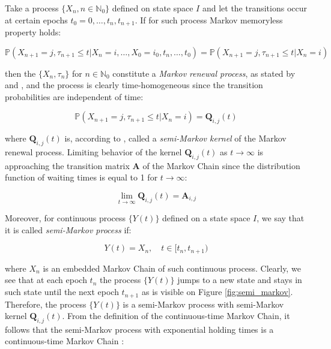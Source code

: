 Take a process $\{X_n,n \in \mathbb{N}_0\}$ defined on state space $I$ and let the transitions occur at certain epochs $t_0=0,\dots,t_n,t_{n+1}$. If for such process Markov memoryless property holds:

\begin{equation}
    \mathbb{P}(X_{n+1}=j, \tau_{n+1} \leq t|X_n=i,\ldots,X_0=i_0,t_n,\ldots,t_0) = \mathbb{P}(X_{n+1}=j, \tau_{n+1} \leq t|X_n=i)
\end{equation}

then the $\{X_n,\tau_n\}$ for $n \in \mathbb{N}_0$ constitute a \textit{Markov renewal process}, as stated by \citep{Cinlar1969} and \citep{Barbu2008}, and the process is clearly time-homogeneous since the transition probabilities are independent of time:

\begin{equation}
    \mathbb{P}(X_{n+1}=j, \tau_{n+1} \leq t|X_n=i) = \textbf{Q}_{i,j}(t)
\end{equation}

where $\textbf{Q}_{i,j}(t)$ is, according to \citep{Medhi2012}, called a \textit{semi-Markov kernel} of the Markov renewal process. Limiting behavior of the kernel $\textbf{Q}_{i,j}(t)$ as $t \to \infty$ 
is approaching the transition matrix $\textbf{A}$ of the Markov Chain since the distribution function of waiting times is equal to 1 for $t \to \infty$:

\begin{equation}
    \lim_{t \to \infty} \textbf{Q}_{i,j}(t) = \textbf{A}_{i,j}
\end{equation}

Moreover, for continuous process $\{Y(t)\}$ defined on a state space $I$, we say that it is called \textit{semi-Markov process} if:

\begin{equation}
    Y(t) = X_n, \quad t \in [t_n,t_{n+1})
\end{equation}

where $X_n$ is an embedded Markov Chain of such continuous process. Clearly, we see that at each epoch $t_n$ the process $\{Y(t)\}$ jumps to a new state and stays in such state until the next epoch $t_{n+1}$ as is visible on Figure \ref{fig:semi_markov}. 
Therefore, the process $\{Y(t)\}$ is a semi-Markov process with semi-Markov kernel $\textbf{Q}_{i,j}(t)$. From the definition of the continuous-time Markov Chain, it follows that the 
semi-Markov process with exponential holding times is a continuous-time Markov Chain \citep{Sahner1996}:

